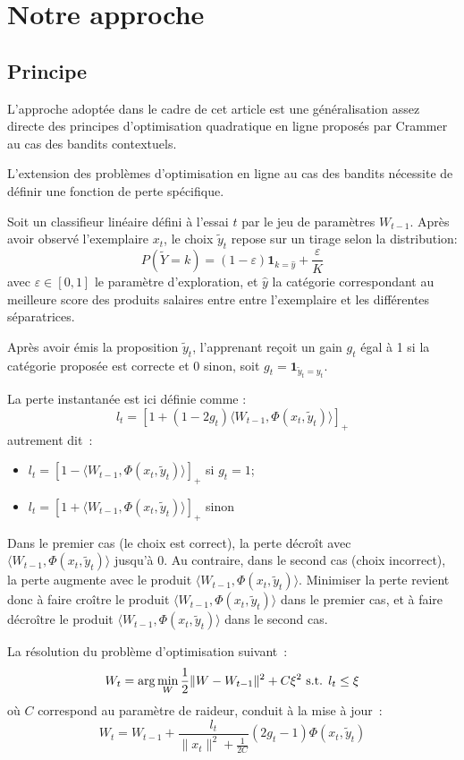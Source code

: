 \documentclass[twocolumn]{article}
\begin{document}
\section{Notre approche}

\subsection{Principe}
L'approche adoptée dans le cadre de cet article est une généralisation assez directe des principes d'optimisation quadratique en ligne proposés par Crammer au cas des bandits contextuels. 

L'extension des problèmes d'optimisation en ligne au cas des bandits nécessite de définir une fonction de perte spécifique. 

Soit un classifieur linéaire défini à l'essai $t$ par le jeu de paramètres $W_{t-1}$. Après avoir observé l'exemplaire $x_t$, le choix $\tilde{y}_t$ repose sur un tirage selon la distribution: $$P(\tilde{Y}=k) = (1 - \varepsilon) \mathbf{1}_{k = \hat{y}} + \frac{\varepsilon}{K} $$ avec $\varepsilon \in [0,1]$ le paramètre d'exploration, et $\hat{y}$ la catégorie correspondant au meilleure score des produits salaires entre entre l'exemplaire et les différentes séparatrices.  

Après avoir émis la proposition $\tilde{y}_t$, l'apprenant reçoit un gain $g_t$ égal à 1 si la catégorie proposée est correcte et 0 sinon, soit $g_t = \mathbf{1}_{\tilde{y}_t=y_t}$. 

La perte instantanée est ici définie comme :
$$l_t = [1 + (1 - 2 g_t) \langle W_{t-1}, \Phi(x_t,\tilde{y}_t)\rangle]_+$$
autrement dit~:
\begin{itemize}
	\item[] $l_t = [1 - \langle W_{t-1}, \Phi(x_t,\tilde{y}_t)\rangle]_+$ si $g_t=1$;
	\item[] $l_t = [1 + \langle W_{t-1}, \Phi(x_t,\tilde{y}_t)\rangle]_+$ sinon
\end{itemize}
Dans le premier cas (le choix est correct), la perte décroît avec $\langle W_{t-1}, \Phi(x_t,\tilde{y}_t)\rangle$ jusqu'à 0. Au contraire, dans le second cas (choix incorrect), la perte augmente avec le produit $\langle W_{t-1}, \Phi(x_t,\tilde{y}_t)\rangle$.
Minimiser la perte revient donc à faire croître le produit $\langle W_{t-1}, \Phi(x_t,\tilde{y}_t)\rangle$ dans le premier cas, et à faire décroître le produit $\langle W_{t-1}, \Phi(x_t,\tilde{y}_t)\rangle$  dans le second cas.

La résolution du problème d'optimisation suivant~:
$$W_{t} = \arg \min_W \frac{1}{2} \| W - W_{t-1}\|^2 + C \xi^2 \hbox{ s.t. } l_t \leq \xi$$
où $C$ correspond au paramètre de raideur, conduit à la mise à jour~:
$$W_{t} =  W_{t-1} + \frac{l_t}{\|x_t\|^2 + \frac{1}{2C}} (2g_t - 1) \Phi(x_t,\tilde{y}_t)$$
\end{document}
